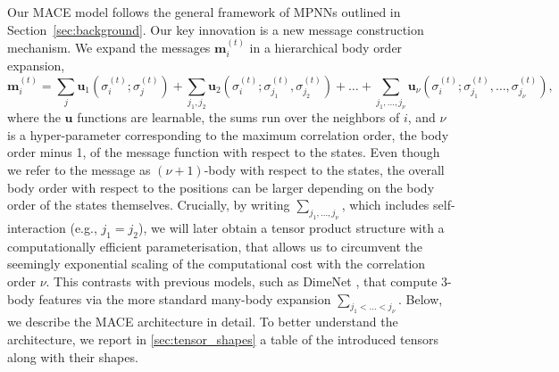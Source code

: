 \documentclass{article}
\begin{document}
Our MACE model follows the general framework of MPNNs outlined in Section~\ref{sec:background}.
Our key innovation is a new message construction mechanism.
We expand the messages $\boldsymbol{m}_i^{(t)}$ in a hierarchical body order expansion,
%
\begin{equation}
  \label{eq:manybodyexpansion}
  {\bm m}_i^{(t)} =
  \sum_j {\bm u}_1 \left( \sigma_i^{(t)}; \sigma_j^{(t)} \right)
  + \sum_{j_1, j_2} {\bm u}_2 \left(\sigma_i^{(t)}; \sigma_{j_1}^{(t)}, \sigma_{j_2}^{(t)} \right)
  + \dots +
  \sum_{j_1, \dots, j_{\nu}} {\bm u}_{\nu} \left( \sigma_i^{(t)}; \sigma_{j_1}^{(t)}, \dots, \sigma_{j_{\nu}}^{(t)} \right),
\end{equation}
%
where the ${\bm u}$ functions are learnable,
the sums run over the neighbors of $i$,
and $\nu$ is a hyper-parameter corresponding to the maximum correlation order, the body order minus 1,
of the message function with respect to the states.
Even though we refer to the message as $(\nu + 1)$-body with respect to the states, the overall body order with respect to the positions can be larger
depending on the body order of the states themselves.
Crucially, by writing $\sum_{j_1, \dots, j_{\nu}}$, which includes self-interaction (e.g., $j_1 = j_2$),
we will later obtain a tensor product structure with a computationally efficient parameterisation,
that allows us to circumvent the seemingly exponential scaling of the computational cost with the correlation order $\nu$.
This contrasts with previous models, such as DimeNet \cite{DimeNet++,DimeNet}, that compute 3-body features via the more standard many-body expansion $\sum_{j_1 < \dots < j_{\nu}}$.
Below, we describe the MACE architecture in detail. To better understand the architecture, we report in \ref{sec:tensor_shapes} a table of the introduced tensors along with their shapes.
\end{document}
